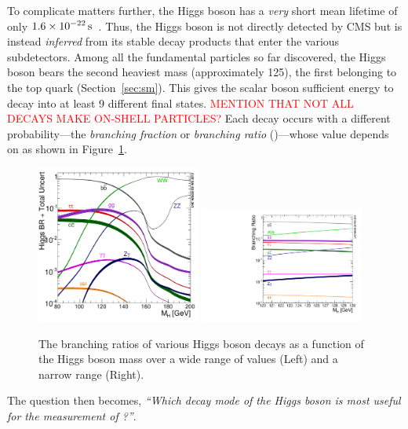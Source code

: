 To complicate matters further, the Higgs boson has a \emph{very} short mean lifetime of only $1.6 \times \text{10}^\text{$-$22}\,\text{s}$~\cite{pdg}.
Thus, the Higgs boson is not directly detected by CMS but is instead \emph{inferred} from its stable decay products that enter the various subdetectors.
Among all the fundamental particles so far discovered, the Higgs boson bears the second heaviest mass (approximately 125\GeV), the first belonging to the top quark (Section~\ref{sec:sm}).
This gives the scalar boson sufficient energy to decay into at least 9 different final states.
\textcolor{red}{MENTION THAT NOT ALL DECAYS MAKE ON-SHELL PARTICLES?}
Each decay occurs with a different probability---the \emph{branching fraction} or \emph{branching ratio} (\br)---whose value depends on \mH as shown in Figure~\ref{fig:higgs_br}.
\begin{figure}[!htbp]
    \begin{center}
		\includegraphics[width=0.48\textwidth]{figures/higgsmassmeas/higgs_BR_80to200GeV.pdf}
		\includegraphics[width=0.48\textwidth]{figures/higgsmassmeas/higgs_BR_120to130GeV.pdf}
		\caption{
            The branching ratios of various Higgs boson decays as a function of the Higgs boson mass
            over a wide range of values (Left) and a narrow range (Right).
            }
		\label{fig:higgs_br}
	\end{center}
\end{figure} 
The question then becomes, \emph{``Which decay mode of the Higgs boson is most useful for the measurement of \mH?''}.


